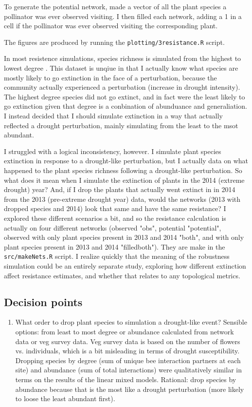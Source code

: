 \documentclass{article}\usepackage[]{graphicx}\usepackage[]{color}
\begin{document}
To generate the potential network, made a vector of all the plant
species a pollinator was ever observed visiting. I then filled each
network, adding a 1 in a cell if the pollinator was ever observed
visiting the corresponding plant.

The figures are produced by running the
\texttt{plotting/3resistance.R} script.

In most resistence simulations, species richness is simulated from the
highest to lowest degree \citep{Memmott2004}. This dataset is unqiue
in that I actually know what species are mostly likely to go
extinction in the face of a perturbation, because the community
actually experienced a perturbation (increase in drought
intensity). The highest degree species did not go extinct, and in fact
were the least likely to go extinction given that degree is a
conbination of abunduance and generaliation. I instead decided that I
should simulate extinction in a way that actually reflected a drought
perturbation, mainly simulating from the least to the msot abundant.

I struggled with a logical inconsistency, however. I simulate plant
species extinction in response to a drought-like perturbation, but I
actually data on what happened to the plant species richness following
a drought-like perturbation. So what does it mean when I simulate the
extinction of plants in the 2014 (extreme drought) year? And, if I
drop the plants that actually went extinct in in 2014 from the 2013
(pre-extreme drought year) data, would the networks (2013 with dropped
species and 2014) look that same and have the same resistance? I
explored these different scenarios a bit, and so the resistance
calculation is actually on four different networks (observed "obs",
potential "potential", observed with only plant species present in
2013 and 2014 "both", and with only plant species present in 2013 and
2014 "filledboth"). They are make in the \texttt{src/makeNets.R}
script. I realize quickly that the meaning of the robustness
simulation could be an entirely separate study, exploring how
different extinction affect resistance estimates, and whether that
relates to any topological metrics.

  \subsection{Decision points}
  \begin{enumerate}
  \item What order to drop plant species to simulation a drought-like
    event? Sensible options: from least to most degree or abundance
    calculated from network data or veg survey data. Veg survey data
    is based on the number of flowers vs. individuals, which is a bit
    misleading in terms of drought susceptibility. Dropping species by
    degree (sum of unique bee interaction partners at each site) and
    abundance (sum of total interactions) were qualitatively similar
    in terms on the results of the linear mixed models. Rational: drop
    species by abundance because that is the most like a drought
    perturbation (more likely to loose the least abundant first).
  \end{enumerate}
\end{document}
